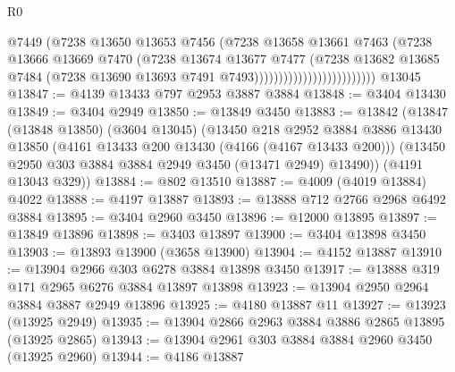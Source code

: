 \begin{lexlean}{R0}
\begin{coremodule}
                                          @7449
                                          (@7238
                                            @13650
                                            @13653
                                            @7456
                                            (@7238
                                              @13658
                                              @13661
                                              @7463
                                              (@7238
                                                @13666
                                                @13669
                                                @7470
                                                (@7238
                                                  @13674
                                                  @13677
                                                  @7477
                                                  (@7238
                                                    @13682
                                                    @13685
                                                    @7484
                                                    (@7238
                                                      @13690
                                                      @13693
                                                      @7491
                                                      @7493)))))))))))))))))))))))))
    @13045
@13847 := @4139 @13433 @797 @2953 @3887 @3884
@13848 := @3404 @13430
@13849 := @3404 @2949
@13850 := @13849 @3450
@13883 := @13842
    (@13847
      (@13848 @13850)
      (@3604 @13045)
      (@13450
        @218
        @2952
        @3884
        @3886
        @13430
        @13850
        (@4161 @13433 @200 @13430 (@4166 (@4167 @13433 @200)))
        (@13450 @2950 @303 @3884 @3884 @2949 @3450 (@13471 @2949) @13490))
      (@4191 @13043 @329))
@13884 := @802 @13510
@13887 := @4009 (@4019 @13884) @4022
@13888 := @4197 @13887
@13893 := @13888 @712 @2766 @2968 @6492 @3884
@13895 := @3404 @2960 @3450
@13896 := @12000 @13895
@13897 := @13849 @13896
@13898 := @3403 @13897
@13900 := @3404 @13898 @3450
@13903 := @13893 @13900 (@3658 @13900)
@13904 := @4152 @13887
@13910 := @13904 @2966 @303 @6278 @3884 @13898 @3450
@13917 := @13888 @319 @171 @2965 @6276 @3884 @13897 @13898
@13923 := @13904 @2950 @2964 @3884 @3887 @2949 @13896
@13925 := @4180 @13887 @11
@13927 := @13923 (@13925 @2949)
@13935 := @13904 @2866 @2963 @3884 @3886 @2865 @13895 (@13925 @2865)
@13943 := @13904 @2961 @303 @3884 @3884 @2960 @3450 (@13925 @2960)
@13944 := @4186 @13887

\end{coremodule}
\end{lexlean}

